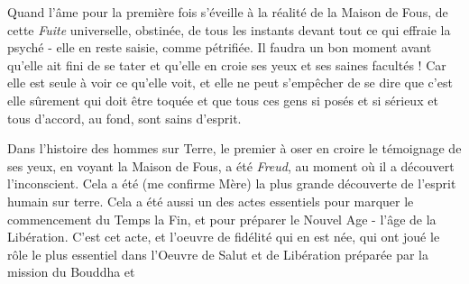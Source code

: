 Quand l'âme pour la première fois s'éveille à la réalité de la Maison de Fous, de cette \textit{Fuite} universelle, obstinée, de tous les instants devant tout ce qui effraie la psyché - elle en reste saisie, comme pétrifiée. Il faudra un bon moment avant qu'elle ait fini de se tater et qu'elle en croie ses yeux et ses saines facultés ! Car elle est seule à voir ce qu'elle voit, et elle ne peut s'empêcher de se dire que c'est elle sûrement qui doit être toquée et que tous ces gens si posés et si sérieux et tous d'accord, au fond, sont sains d'esprit.

Dans l'histoire des hommes sur Terre, le premier à oser en croire le témoignage de ses yeux, en voyant la Maison de Fous, a été \textit{Freud}, au moment où il a découvert l'inconscient. Cela a été (me confirme Mère) la plus grande découverte de l'esprit humain sur terre. Cela a été aussi un des actes essentiels pour marquer le commencement du Temps  la Fin, et pour préparer le Nouvel Age - l'âge de la Libération. C'est cet acte, et l'oeuvre de fidélité qui en est née, qui ont joué le rôle le plus essentiel dans l'Oeuvre de Salut et de Libération préparée par la mission du Bouddha et
